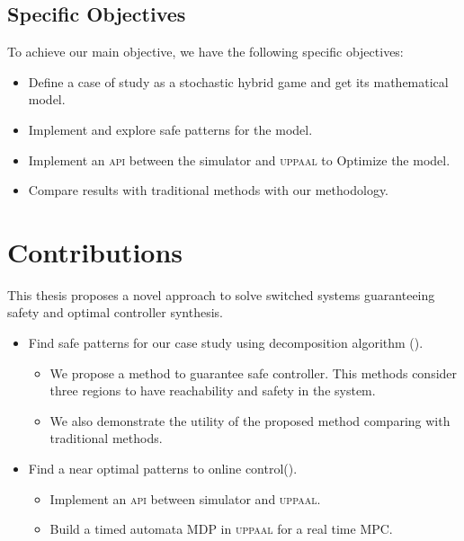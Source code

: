         \subsection*{Specific Objectives}
        To achieve our main objective, we have the following specific objectives:
        \begin{itemize}
            \item Define a case of study as a stochastic hybrid game and get its mathematical model.
            \item Implement and explore safe patterns for the model.
            \item Implement an \textsc{api} between the simulator and \textsc{uppaal} to Optimize the model.
            \item Compare results with traditional methods with our methodology.
        \end{itemize}


    \section{Contributions}
    \label{sec:contributions}
        This thesis proposes a novel approach to solve 
        switched systems guaranteeing safety and optimal
        controller synthesis. 

        
        \begin{itemize}
            \item Find safe patterns for our case study using
            decomposition algorithm (\cite{le2017improved}).
                \begin{itemize}
                    \item We propose a method to guarantee safe controller. This methods consider three regions to have reachability and safety in the system.
                    \item We also demonstrate the utility of the proposed method comparing with traditional methods.
                \end{itemize}
            \item Find a near optimal patterns to online control(\cite{larsen2016online}).
            \begin{itemize}
                \item Implement an \textsc{api} between simulator and \textsc{uppaal}.
                \item Build a timed automata MDP in \textsc{uppaal} for a real time \textsc{MPC}.
            \end{itemize}
        \end{itemize}

